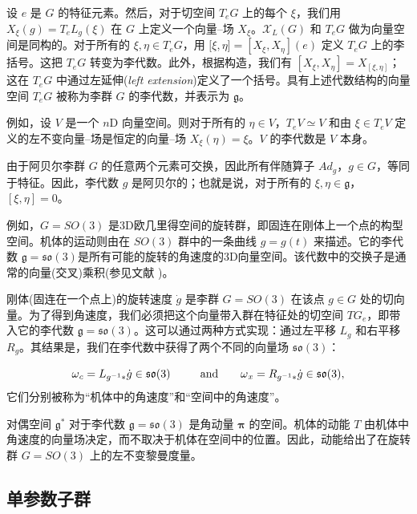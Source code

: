 \documentclass[11pt,fontset=founder]{ctexart}
\begin{document}
设 $e$ 是 $G$ 的特征元素。然后，对于切空间 $T_{e}G$ 上的每个 $\xi $，我们用 $X_{\xi}(g)=T_{e}L_{g}(\xi )$ 在 $G$ 上定义一个向量–场 $X_{\xi }$。$\mathcal{X}_{L}(G)$ 和 $T_{e}G$ 做为向量空间是同构的。对于所有的 $\xi ,\eta \in T_{e}G$，用 $\lbrack \xi ,\eta ]=\left[ X_{\xi },X_{\eta }\right] (e)$ 定义 $T_{e}G$ 上的李括号。这把 $T_{e}G$ 转变为李代数。此外，根据构造，我们有 $\left[X_{\xi },X_{\eta }\right] =X_{[\xi ,\eta ]}$；这在 $T_{e}G$ 中通过左延伸(\emph{left extension})定义了一个括号。具有上述代数结构的向量空间 $T_{e}G$ 被称为李群 $G$ 的李代数，并表示为 $\mathfrak{g}$。

例如，设 $V$ 是一个 $n$D 向量空间。则对于所有的 $\eta \in V$，$T_{e}V\simeq V$ 和由 $\xi \in T_{e}V$ 定义的左不变向量–场是恒定的向量–场 $X_{\xi }(\eta )=\xi $。$V$ 的李代数是 $V$ 本身。

由于阿贝尔李群 $G$ 的任意两个元素可交换，因此所有伴随算子 $Ad_{g}$，$g\in G$，等同于特征。因此，李代数 $g$ 是阿贝尔的；也就是说，对于所有的 $\xi ,\eta \in \mathfrak{g}$，$[\xi ,\eta ]=0$。

例如，$G=SO(3)$ 是3D欧几里得空间的旋转群，即固连在刚体上一个点的构型空间。机体的运动则由在 $SO(3)$ 群中的一条曲线 $g=g(t)$ 来描述。它的李代数 $\mathfrak{g}=\mathfrak{so}(3)$是所有可能的旋转的角速度的3D向量空间。该代数中的交换子是通常的向量(交叉)乘积(参见文献 \cite{Arnold,Abraham,GaneshADG})。

刚体(固连在一个点上)的旋转速度 $\dot{g}$ 是李群 $G=SO(3)$ 在该点 $g\in G$ 处的切向量。为了得到角速度，我们必须把这个向量带入群在特征处的切空间 $TG_{e}$，即带入它的李代数 $\mathfrak{g}=\mathfrak{so}(3)$。这可以通过两种方式实现：通过左平移 $L_{g}$ 和右平移 $R_{g}$。其结果是，我们在李代数中获得了两个不同的向量场 $\mathfrak{so}(3)$：

\begin{equation*}
\omega _{c}=L_{g^{-1}\ast }\dot{g}\in \mathfrak{so}(3)\qquad \text{and\qquad
}\omega _{x}=R_{g^{-1}\ast }\dot{g}\in \mathfrak{so}(3),
\end{equation*}%
它们分别被称为“机体中的角速度”和“空间中的角速度”。

对偶空间 $\mathfrak{g}^{\ast }$ 对于李代数 $\mathfrak{g}=\mathfrak{so}(3)$ 是角动量 $\mathbf{\pi }$ 的空间。机体的动能 $T$ 由机体中角速度的向量场决定，而不取决于机体在空间中的位置。因此，动能给出了在旋转群 $G=SO(3)$ 上的左不变黎曼度量。

\subsection{单参数子群}
\end{document}
